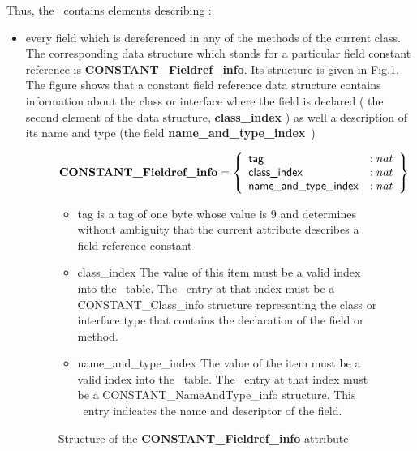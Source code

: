 Thus, the \constantPool \ contains elements describing :
\begin{itemize}
  \item every field which is dereferenced in any of the methods
of the current class. The corresponding data structure which stands for a particular field constant reference is 
 \textbf{CONSTANT\_Fieldref\_info}. Its structure is given in Fig.\ref{fldConstant}. The figure shows that
 a constant  field reference data structure contains information about the class or interface where the field is declared 
( the second element of the data structure, \textbf{class\_index}  )
 as well a description of its name and type (the field \textbf{name\_and\_type\_index}~)
   \begin{figure}
$$
\mbox{\rm\textbf{CONSTANT\_Fieldref\_info}} =  \left\{\begin{array}{ll} 
                                                   \mbox{\rm\textsf{tag}}    & :   nat \\
                                                   \mbox{\rm\textsf{class\_index}}     & :   nat \\
						   \mbox{\rm\textsf{name\_and\_type\_index}} & : nat
	                        \end{array} \right\}$$

\begin{itemize}
\item \textsf{tag} is a tag of one byte  whose value is 9 and  determines without 
       ambiguity that the current attribute describes a field reference constant

\item \textsf{class\_index} The value of this item must be a valid index into the \constantPool \ table. 
                            The \constantPool \ entry at that index must be a \textsf{CONSTANT\_Class\_info} structure
			    representing the class or interface type that contains the declaration of the field or method.

\item \textsf{name\_and\_type\_index}   The value of the item must be a valid index into the \constantPool \ table.
                                        The \constantPool \ entry at that index must be a \textsf{CONSTANT\_NameAndType\_info }
					structure. This \constantPool \ entry indicates the name and descriptor of the field.

\end{itemize}
\caption{ { \sc Structure of the } \textbf{CONSTANT\_Fieldref\_info} { \sc attribute }  }
\label{fldConstant}
\end{figure}


\end{itemize}
